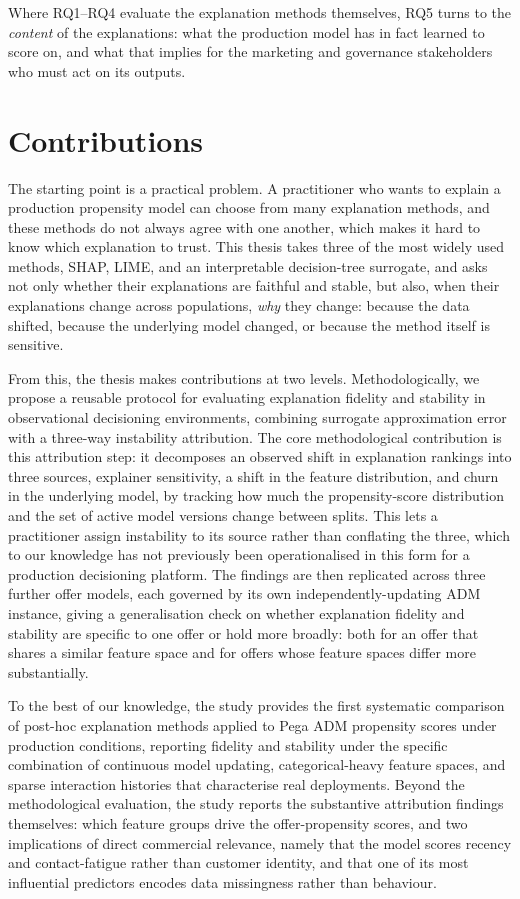 \documentclass[oneside]{memoir} %
\begin{document}
\noindent Where RQ1--RQ4 evaluate the explanation methods themselves, RQ5 turns to the \emph{content} of the explanations: what the production model has in fact learned to score on, and what that implies for the marketing and governance stakeholders who must act on its outputs.

\section{Contributions}

The starting point is a practical problem. A practitioner who wants to explain a production propensity model can choose from many explanation methods, and these methods do not always agree with one another, which makes it hard to know which explanation to trust. This thesis takes three of the most widely used methods, SHAP, LIME, and an interpretable decision-tree surrogate, and asks not only whether their explanations are faithful and stable, but also, when their explanations change across populations, \emph{why} they change: because the data shifted, because the underlying model changed, or because the method itself is sensitive.

From this, the thesis makes contributions at two levels. Methodologically, we propose a reusable protocol for evaluating explanation fidelity and stability in observational decisioning environments, combining surrogate approximation error with a three-way instability attribution. The core methodological contribution is this attribution step: it decomposes an observed shift in explanation rankings into three sources, explainer sensitivity, a shift in the feature distribution, and churn in the underlying model, by tracking how much the propensity-score distribution and the set of active model versions change between splits. This lets a practitioner assign instability to its source rather than conflating the three, which to our knowledge has not previously been operationalised in this form for a production decisioning platform. The findings are then replicated across three further offer models, each governed by its own independently-updating ADM instance, giving a generalisation check on whether explanation fidelity and stability are specific to one offer or hold more broadly: both for an offer that shares a similar feature space and for offers whose feature spaces differ more substantially.

To the best of our knowledge, the study provides the first systematic comparison of post-hoc explanation methods applied to Pega ADM propensity scores under production conditions, reporting fidelity and stability under the specific combination of continuous model updating, categorical-heavy feature spaces, and sparse interaction histories that characterise real deployments. Beyond the methodological evaluation, the study reports the substantive attribution findings themselves: which feature groups drive the offer-propensity scores, and two implications of direct commercial relevance, namely that the model scores recency and contact-fatigue rather than customer identity, and that one of its most influential predictors encodes data missingness rather than behaviour.
\end{document}
